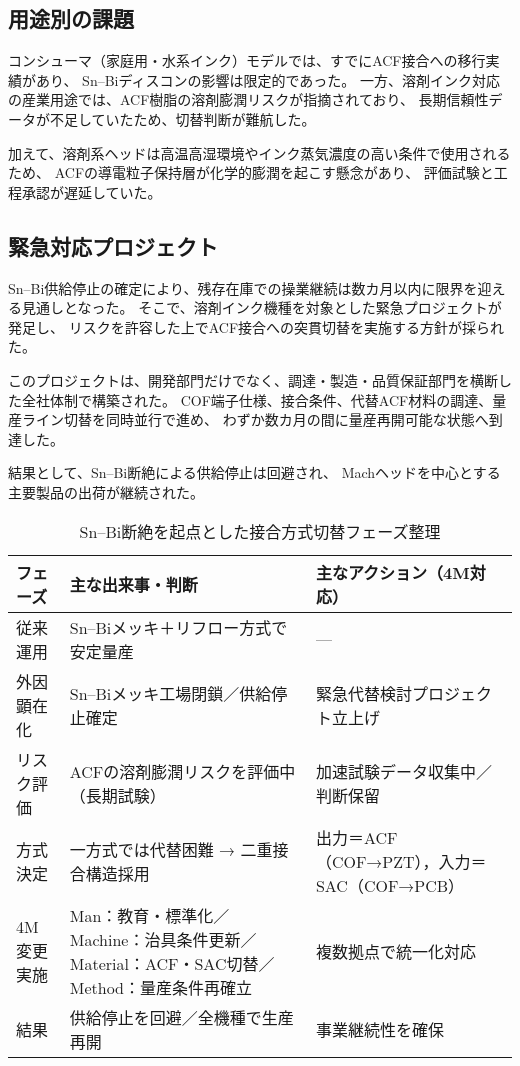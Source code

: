 \documentclass[conference]{IEEEtran}
\begin{document}
\subsection{用途別の課題}
コンシューマ（家庭用・水系インク）モデルでは、すでにACF接合への移行実績があり、  
Sn–Biディスコンの影響は限定的であった。  
一方、溶剤インク対応の産業用途では、ACF樹脂の溶剤膨潤リスクが指摘されており、  
長期信頼性データが不足していたため、切替判断が難航した。  

加えて、溶剤系ヘッドは高温高湿環境やインク蒸気濃度の高い条件で使用されるため、  
ACFの導電粒子保持層が化学的膨潤を起こす懸念があり、  
評価試験と工程承認が遅延していた。

\subsection{緊急対応プロジェクト}
Sn–Bi供給停止の確定により、残存在庫での操業継続は数カ月以内に限界を迎える見通しとなった。  
そこで、溶剤インク機種を対象とした緊急プロジェクトが発足し、  
リスクを許容した上でACF接合への突貫切替を実施する方針が採られた。  

このプロジェクトは、開発部門だけでなく、調達・製造・品質保証部門を横断した全社体制で構築された。  
COF端子仕様、接合条件、代替ACF材料の調達、量産ライン切替を同時並行で進め、  
わずか数カ月の間に量産再開可能な状態へ到達した。  

結果として、Sn–Bi断絶による供給停止は回避され、  
Machヘッドを中心とする主要製品の出荷が継続された。

\begin{table}[t]
\centering
\footnotesize
\caption{Sn–Bi断絶を起点とした接合方式切替フェーズ整理}
\label{tab:flow}
\renewcommand{\arraystretch}{1.1}
\begin{tabularx}{\columnwidth}{@{}p{1.9cm} Y Y@{}}
\toprule
フェーズ & 主な出来事・判断 & 主なアクション（4M対応） \\
\midrule
従来運用 &
Sn–Biメッキ＋リフロー方式で安定量産 &
— \\
\addlinespace[2pt]
外因顕在化 &
Sn–Biメッキ工場閉鎖／供給停止確定 &
緊急代替検討プロジェクト立上げ \\
\addlinespace[2pt]
リスク評価 &
ACFの溶剤膨潤リスクを評価中（長期試験） &
加速試験データ収集中／判断保留 \\
\addlinespace[2pt]
方式決定 &
一方式では代替困難 → 二重接合構造採用 &
出力＝ACF（COF→PZT），入力＝SAC（COF→PCB） \\
\addlinespace[2pt]
4M変更実施 &
Man：教育・標準化／Machine：治具条件更新／Material：ACF・SAC切替／Method：量産条件再確立 &
複数拠点で統一化対応 \\
\addlinespace[2pt]
結果 &
供給停止を回避／全機種で生産再開 &
事業継続性を確保 \\
\bottomrule
\end{tabularx}
\end{table}
\end{document}
